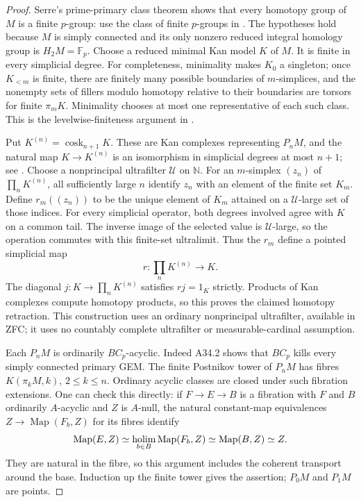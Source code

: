 \begin{proof}
Serre's prime-primary class theorem shows that every homotopy group
of $M$ is a finite $p$-group: use the class of finite $p$-groups in
\citet[Chapter I, \S6.4; Chapter III, Corollary 2, p.~274]{A4SerreClasses}.
The hypotheses hold because $M$ is simply connected and its only
nonzero reduced integral homology group is $H_2M=\mathbb F_p$.
Choose a reduced minimal Kan model $K$ of $M$.  It is finite in every
simplicial degree.  For completeness, minimality makes $K_0$ a
singleton; once $K_{<m}$ is finite, there are finitely many possible
boundaries of $m$-simplices, and the nonempty sets of fillers modulo
homotopy relative to their boundaries are torsors for finite
$\pi_mK$.  Minimality chooses at most one representative of each
such class.  This is the levelwise-finiteness argument in
\citet[Lemma 7.2.4 and its proof]{A4BarneaHarpazHorel}.

Put $K^{(n)}=\operatorname{cosk}_{n+1}K$.  These are Kan complexes
representing $P_nM$, and the natural map $K\to K^{(n)}$ is an
isomorphism in simplicial degrees at most $n+1$;
see \citet[Proposition 3.5.3.23 and Examples 3.5.7.24,
3.5.8.4]{A4KerodonPostnikov}.
Choose a nonprincipal ultrafilter $\mathcal U$ on $\mathbb N$.
For an $m$-simplex $(z_n)$ of $\prod_nK^{(n)}$, all sufficiently
large $n$ identify $z_n$ with an element of the finite set $K_m$.
Define $r_m((z_n))$ to be the unique element of $K_m$ attained on a
$\mathcal U$-large set of those indices.  For every simplicial
operator, both degrees involved agree with $K$ on a common tail.
The inverse image of the selected value is $\mathcal U$-large, so
the operation commutes with this finite-set ultralimit.  Thus the
$r_m$ define a pointed simplicial map
\[
       r:\prod_nK^{(n)}\longrightarrow K.
\]
The diagonal $j:K\to\prod_nK^{(n)}$ satisfies $rj=1_K$
strictly.  Products of Kan complexes compute homotopy products, so
this proves the claimed homotopy retraction.  This construction uses
an ordinary nonprincipal ultrafilter, available in ZFC; it uses no
countably complete ultrafilter or measurable-cardinal assumption.

Each $P_nM$ is ordinarily $BC_p$-acyclic.  Indeed A34.2 shows that
$BC_p$ kills every simply connected primary GEM.  The finite
Postnikov tower of $P_nM$ has fibres
$K(\pi_kM,k)$, $2\leq k\leq n$.  Ordinary acyclic classes are
closed under such fibration extensions.  One can check this directly:
if $F\to E\to B$ is a fibration with $F$ and $B$ ordinarily
$A$-acyclic and $Z$ is $A$-null, the natural constant-map equivalences
$Z\to\operatorname{Map}(F_b,Z)$ for its fibres identify
\[
 \operatorname{Map}(E,Z)
   \simeq\operatorname*{holim}_{b\in B}\operatorname{Map}(F_b,Z)
   \simeq\operatorname{Map}(B,Z)\simeq Z.
\]
They are natural in the fibre, so this argument includes the
coherent transport around the base.  Induction up the finite tower
gives the assertion; $P_0M$ and $P_1M$ are points.


\end{proof}
